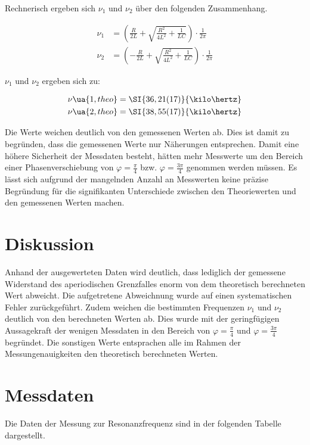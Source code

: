 Rechnerisch ergeben sich $\nu_1$ und $\nu_2$ über den folgenden Zusammenhang.

\begin{align}
  \nu_1 &= (\frac{R}{2L} + \sqrt{\frac{R^2}{4L^2} + \frac{1}{LC}})\cdot \frac{1}{2\pi} \\
  \nu_2 &= (-\frac{R}{2L} + \sqrt{\frac{R^2}{4L^2} + \frac{1}{LC}})\cdot \frac{1}{2\pi}
\end{align}

$\nu_1$ und $\nu_2$ ergeben sich zu:

\begin{align*}
  \nu\ua{1,theo} &= \SI{36,21(17)}{\kilo\hertz} \\
  \nu\ua{2,theo} &= \SI{38,55(17)}{\kilo\hertz}
\end{align*}

Die Werte weichen deutlich von den gemessenen Werten ab.
Dies ist damit zu begründen, dass die gemessenen Werte nur Näherungen entsprechen.
Damit eine höhere Sicherheit der Messdaten besteht, hätten mehr Messwerte um den
Bereich einer Phasenverschiebung von $\varphi = \frac{\pi}{4}$ bzw.
$\varphi = \frac{3\pi}{4}$ genommen werden müssen. Es lässt sich aufgrund der
mangelnden Anzahl an Messwerten keine präzise Begründung für die signifikanten Unterschiede
zwischen den Theoriewerten und den gemessenen Werten machen.

\section{Diskussion}

Anhand der ausgewerteten Daten wird deutlich, dass lediglich der gemessene
Widerstand des aperiodischen Grenzfalles enorm von dem theoretisch berechneten Wert
abweicht.
Die aufgetretene Abweichnung wurde auf einen systematischen Fehler zurückgeführt.
Zudem weichen die bestimmten Frequenzen $\nu_1$ und $\nu_2$ deutlich von den
berechneten Werten ab. Dies wurde mit der geringfügigen Aussagekraft der wenigen
Messdaten in den Bereich von $\varphi = \frac{\pi}{4}$ und $\varphi = \frac{3\pi}{4}$
begründet.
Die sonstigen Werte entsprachen alle im Rahmen der Messungenauigkeiten den theoretisch
berechneten Werten.

\newpage

\section{Messdaten}

Die Daten der Messung zur Resonanzfrequenz sind in der folgenden Tabelle dargestellt.

